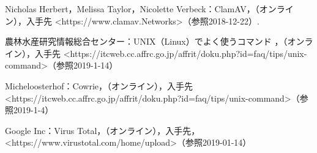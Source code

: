 \begin{thebibliography}{30}
         Nicholas Herbert，Melissa Taylor，Nicolette Verbeck：ClamAV，（オンライン），入手先 \textless https:\slash\slash{}www.clamav.Networks\textgreater（参照2018-12-22）.
    
       農林水産研究情報総合センター：UNIX（Linux）でよく使うコマンド ，（オンライン），入手先 \textless https:\slash\slash{}itcweb.cc.affrc.go.jp\slash{}affrit/doku.php?id=faq\slash{}tips\slash{}unix-command\textgreater（参照2019-1-14）
    
        Micheloosterhof：Cowrie，（オンライン），入手先 \textless https:\slash\slash{}itcweb.cc.affrc.go.jp\slash{}affrit\slash{}doku.php?id=faq\slash{}tips/unix-command\textgreater（参照2019-1-4）
    
        Google Inc：Virus Total，（オンライン），入手先，\textless https:\slash\slash{}www.virustotal.com\slash{}home\slash{}upload\textgreater（参照2019-01-14）
\end{thebibliography}

